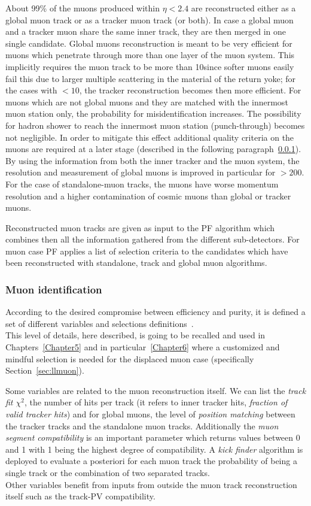 About 99\% of the muons produced within $\eta < 2.4$ are reconstructed
either as a global muon track or as a tracker muon track (or
both). In case a global muon and a tracker muon share the same inner
track, they are then merged in one single candidate.
Global muons reconstruction is meant to be very efficient for muons
which penetrate
through more than one layer of the muon system. This implicitly
requires the muon track \pt to be more than 10\GeV since softer muons
easily fail this due to larger multiple scattering in the material of the return yoke; for the cases with
\pt$< 10$\GeV, the tracker reconstruction becomes then more efficient.
For muons which are not global muons and
they are matched with the innermost muon station only,
the probability for misidentification increases. The possibility for
hadron shower to reach the innermost muon station (punch-through)
becomes not negligible. In order to mitigate this effect additional
quality criteria on the muons are required at a later stage (described
in the following paragraph~\ref{sec:c2muonselection}).
By using the information from both the
inner tracker and the muon
system, the \pt resolution and measurement of global muons is improved
in particular for \pt $> 200$\GeV. For the case of standalone-muon
tracks, the muons have worse momentum resolution and a higher
contamination of cosmic muons than global or tracker muons.

Reconstructed muon tracks are given as input to the PF algorithm which
combines then all the information gathered from the different
sub-detectors. For muon case PF applies a list of selection criteria
to the candidates which have been reconstructed with standalone, track
and global muon algorithms. 

\subsubsection{Muon identification}\label{sec:c2muonselection}
According to the desired compromise between efficiency and purity, it
is defined a set of different variables and selections definitions~\cite{Sirunyan_2018_muon}.\\
This level of details, here described, is going to be recalled and
used in Chapters~\ref{Chapter5} and in particular~\ref{Chapter6} where a customized and mindful selection is needed
for the displaced muon case (specifically Section~\ref{sec:llmuon}).

Some variables are related to the muon reconstruction itself. We can
list the \emph{track fit $\chi^2$}, the number of hits per track (it refers
to inner tracker hits, \emph{fraction of valid tracker hits}) and for global muons, the
level of \emph{position matching} between the tracker tracks and the standalone muon
tracks. Additionally the \emph{muon segment
compatibility} is an important parameter which returns values between 0
and 1 with 1 being the highest degree of compatibility. A \emph{kick
  finder} algorithm is deployed to evaluate a posteriori for each muon
track the
probability of being a single track or the combination of two
separated tracks.  \\
Other variables benefit from inputs from outside the muon track
reconstruction itself such as the track-PV compatibility.

